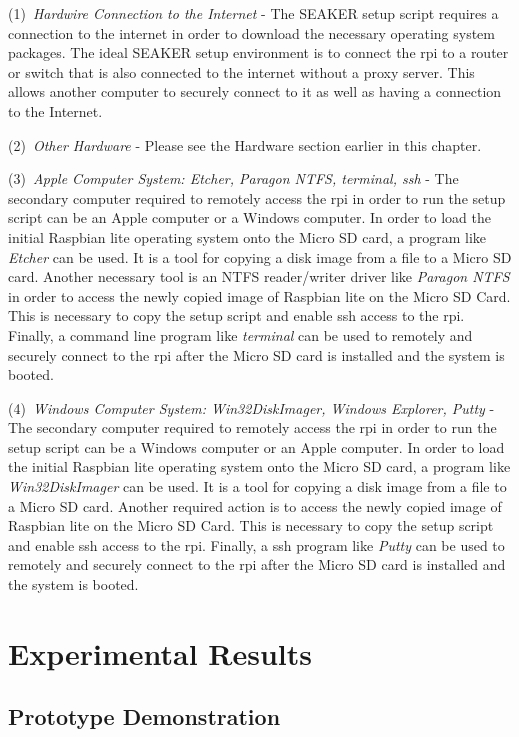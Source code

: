\documentclass[12pt]{article}
\begin{document}
(1)~{\em Hardwire Connection to the Internet} - The SEAKER setup script
requires a connection to the internet in order to download the necessary
operating system packages.  The ideal SEAKER setup environment is to 
connect the \gls{rpi} to a router or switch that is also connected to 
the internet without a proxy server.  This allows another computer to
securely connect to it as well as having a connection to the Internet.

(2)~{\em Other Hardware} - Please see the Hardware section earlier in this
chapter.

(3)~{\em Apple Computer System: Etcher, Paragon NTFS, terminal, \gls{ssh}} - The secondary
computer required to remotely access the \gls{rpi} in order to run the
setup script can be an Apple computer or a Windows computer.  In order to load
the initial Raspbian lite operating system onto the Micro SD card, a program like
{\em Etcher} can be used.  It is a tool for copying a disk image from a file to a 
Micro SD card.  Another necessary tool is an NTFS reader/writer driver like {\em Paragon
NTFS} in order to access the newly copied image of Raspbian lite on the Micro SD Card.
This is necessary to copy the setup script and enable \gls{ssh} access to the \gls{rpi}.
Finally, a command line program like {\em terminal} can be used to remotely and
securely connect to the \gls{rpi} after the Micro SD card is installed and the 
system is booted.

(4)~{\em Windows Computer System: Win32DiskImager, Windows Explorer, Putty} - 
The secondary
computer required to remotely access the \gls{rpi} in order to run the
setup script can be a Windows computer or an Apple computer.  In order to load
the initial Raspbian lite operating system onto the Micro SD card, a program like
{\em Win32DiskImager} can be used.  It is a tool for copying a disk image from a file to a 
Micro SD card.  Another required action is to access the newly copied image of
Raspbian lite on the Micro SD Card. This is necessary to copy the setup script
and enable \gls{ssh} access to the \gls{rpi}.
Finally, a \gls{ssh} program like {\em Putty} can be used to remotely and
securely connect to the \gls{rpi} after the Micro SD card is installed and the 
system is booted.


\section{Experimental Results}
\label{sect-experimentalResults}

\subsection{Prototype Demonstration}
\end{document}
